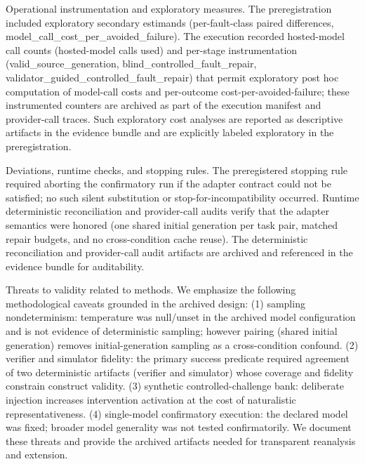 \documentclass[conference]{IEEEtran}
\begin{document}
Operational instrumentation and exploratory measures. The preregistration included exploratory secondary estimands (per-fault-class paired differences, model\_call\_cost\_per\_avoided\_failure). The execution recorded hosted-model call counts (hosted-model calls used) and per-stage instrumentation (valid\_source\_generation, blind\_controlled\_fault\_repair, validator\_guided\_controlled\_fault\_repair) that permit exploratory post hoc computation of model-call costs and per-outcome cost-per-avoided-failure; these instrumented counters are archived as part of the execution manifest and provider-call traces. Such exploratory cost analyses are reported as descriptive artifacts in the evidence bundle and are explicitly labeled exploratory in the preregistration.

Deviations, runtime checks, and stopping rules. The preregistered stopping rule required aborting the confirmatory run if the adapter contract could not be satisfied; no such silent substitution or stop-for-incompatibility occurred. Runtime deterministic reconciliation and provider-call audits verify that the adapter semantics were honored (one shared initial generation per task pair, matched repair budgets, and no cross-condition cache reuse). The deterministic reconciliation and provider-call audit artifacts are archived and referenced in the evidence bundle for auditability.

Threats to validity related to methods. We emphasize the following methodological caveats grounded in the archived design: (1) sampling nondeterminism: temperature was null/unset in the archived model configuration and is not evidence of deterministic sampling; however pairing (shared initial generation) removes initial-generation sampling as a cross-condition confound. (2) verifier and simulator fidelity: the primary success predicate required agreement of two deterministic artifacts (verifier and simulator) whose coverage and fidelity constrain construct validity. (3) synthetic controlled-challenge bank: deliberate injection increases intervention activation at the cost of naturalistic representativeness. (4) single-model confirmatory execution: the declared model was fixed; broader model generality was not tested confirmatorily. We document these threats and provide the archived artifacts needed for transparent reanalysis and extension.
\end{document}
